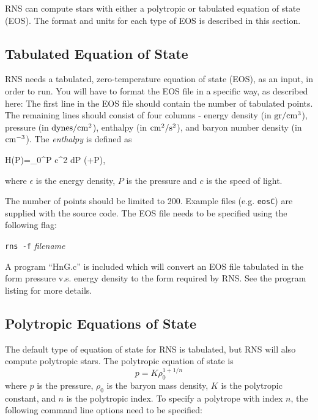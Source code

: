 RNS can compute stars with either a polytropic or tabulated 
equation of state (EOS). 
The format and units for each type of EOS is described in this 
section. 

\subsection{Tabulated Equation of State}
RNS needs a tabulated, zero-temperature equation of state (EOS), as an input, 
in order to run. 
You will have to format the EOS file in a specific way, as described here: 
The first line in the EOS file should contain the number of tabulated points. 
The remaining lines should consist of four columns - energy 
density (in ${\rm gr/cm^3}$), pressure (in ${\rm dynes/cm^2}$), enthalpy (in
${\rm cm^2/s^2}$), and baryon number density (in ${\rm cm^{-3}}$). The 
{\it enthalpy} is defined as

\bee H(P)=\int_0^P { c^2 dP \over (\epsilon +P)}, \ee

\<where $\epsilon$ is the energy density, $P$ is the pressure and $c$ is the
speed of light.

The number of points should be limited to 200. Example files 
(e.g. {\tt eosC}) are supplied with the source code. The EOS file needs to be 
specified
using the following flag:

\vspace{0.3cm}

{\tt rns -f} {\it filename}

\vspace{0.3cm}

A program ``HnG.c'' is included which will convert an EOS file 
tabulated in the form pressure v.s. energy density to the 
form required by RNS. See the program listing for more details.

\subsection{Polytropic Equations of State}

The default type of equation of state for RNS is tabulated, but RNS
will also compute polytropic stars. The polytropic equation of
state is 
\begin{equation}
	p = K \rho_0^{1 + 1/n}
\end{equation}
where $p$ is the pressure, $\rho_0$ is the baryon mass density,
$K$ is the polytropic constant, and $n$ is the polytropic index. To 
specify a polytrope with index $n$, the following command line
options need to be specified:

